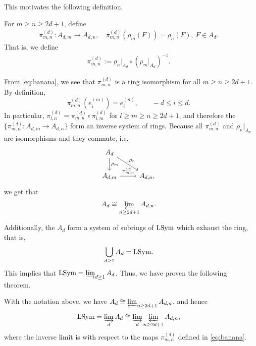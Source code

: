 \documentclass[11pt]{amsart}
\begin{document}
This motivates the following definition.

\begin{defin}
For \(m\geq n\geq 2d+1\), define
\begin{align}
     \pi_{m,n}^{(d)}\colon A_{d,m}\longrightarrow A_{d,n}, \quad  \pi_{m,n}^{(d)}(\rho_m(F))=\rho_n(F), \ F\in A_d.
\end{align}
That is, we define
    \begin{align}
        \pi_{m,n}^{(d)} := \rho_n|_{A_d} \circ (\rho_m|_{A_d})^{-1}. \label{eq:banana}
    \end{align}
\end{defin}
From \cref{eq:banana}, we see that \(\pi^{(d)}_{m,n}\) is a ring isomorphism for all \(m \geq n \geq 2d + 1\). By definition,
\[
\pi_{m,n}^{(d)} (e_i^{(m)}) = e_i^{(n)}, \qquad -d \leq i \leq d.
\]
In particular, \(\pi_{l,n}^{(d)} = \pi_{m,n}^{(d)} \circ \pi_{l,m}^{(d)} \) for \(l \geq m \geq n \geq 2d + 1\), and therefore the \(\{\pi_{m,n}^{(d)}\colon A_{d,m} \rightarrow A_{d,n}\}\) form an inverse system of rings. Because all \(\pi_{m,n}^{(d)}\) and \(\rho_n|_{A_d}\) are isomorphisms and they commute, i.e.
\[
\begin{tikzcd}
A_d \arrow[d, "\rho_m"] \arrow[rd, "\rho_n"] &           \\
{A_{d,m}} \arrow[r, "{\pi_{m,n}^{(d)}}"]     & {A_{d,n}},
\end{tikzcd}
\]
we get that 
\begin{align}
    A_d \cong \varprojlim_{n \geq 2d + 1} A_{d,n}.
\end{align}



Additionally, the \(A_d\) form a system of subrings of \(\mathrm{LSym}\) which exhaust the ring, that is, 
\begin{align}
    \bigcup_{d \geq 1} A_d = \mathrm{LSym}.
\end{align}
 This implies that \(\mathrm{LSym} = \varinjlim_{d \geq 1} A_d \). Thus, we have proven the following theorem.
\begin{theo}
    With the notation above, we have $ A_d \cong \varprojlim_{n\geq 2d+1} A_{d,n}$, and hence
    \begin{align}
        \mathrm{LSym}
        =
        \varinjlim_d A_d
        \cong
        \varinjlim_d \varprojlim_{n\geq 2d+1} A_{d,n},
    \end{align}
    where the inverse limit is with respect to the maps $\pi^{(d)}_{m,n}$ defined in \cref{eq:banana}. 
\end{theo}
\end{document}
